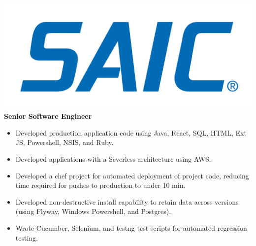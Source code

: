 \documentclass[12pt, line, margin]{res}
\begin{document}
\begin{resume}
 \pagebreak
 {\sl  \includegraphics[scale=0.015, trim=110 200 110 120]{resume_images/SAIC_logo_RGB-lg.jpg}}  \newline
                \textbf{Senior Software Engineer} 
                 \begin{itemize}  \itemsep -2pt %
	      \item   Developed production application code using Java, React, SQL, \newline
                                HTML, Ext JS, Powershell, NSIS, and Ruby.
	      \item   Developed applications with a Severless architecture using AWS.
	      \item   Developed a chef project for automated deployment of project \newline 
                                code, reducing time required for pushes to production to under 10 min.
	      \item   Developed non-destructive install capability to retain data across\newline
                               versions (using Flyway, Windows Powershell, and Postgres). 
                \item   Wrote Cucumber, Selenium, and testng test scripts for automated \newline
                               regression testing.
                \end{itemize}
 



\end{resume}
\end{document}
